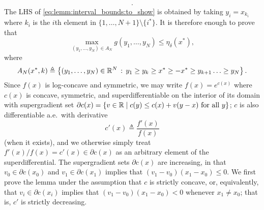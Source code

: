 \begin{proof-of-lemma}[\ref{lem:bound_intervals_delta}]
\begin{align}
{    } \label{eq:g_def}.
  \end{align}
  The LHS of \eqref{eq:lemm:interval_bounds:to_show} is obtained by taking $y_i=x_{k_i}$ where $k_i$ is the $i$th element in $\{1,\ldots,N+1\}\setminus \{i^*\}$. It is therefore enough to prove that 
  \begin{equation*}
    \max_{(y_1,\ldots,y_N) \in A_N} g(y_1,\ldots,y_N) \leq \eta_{\delta}(x^*),
  \end{equation*}
  where 
  \begin{equation*}
    A_N(x^*,k) \triangleq \left\{ (y_1,\ldots,y_N) \in \mathbb{R}^N\, : \, y_1 \ge y_k \ge x^* \ge -x^* \ge y_{k+1} \ldots \ge y_N
    \right\}.
  \end{equation*}
  Since $f(x)$ is log-concave and symmetric, we may write $f(x) = e^{c(x)}$
  where $c(x)$ is concave, symmetric, and superdifferentiable on the interior
  of its domain with
  supergradient set $\partial c(x) = \{v \in \mathbb{R} \mid c(y) \le c(x) + v (y - x) ~
  \mbox{for~all}~ y\}$; $c$ is also
  differentiable a.e.\ with derivative
  \begin{equation*}
    c'(x) \triangleq \frac{f'(x)}{f(x)}
  \end{equation*}
  (when it exists), and we otherwise simply treat $f'(x) / f(x) = c'(x) \in
  \partial c(x)$ as an arbitrary element of the superdifferential.  The
  supergradient sets $\partial c(x)$ are increasing, in that $v_0 \in
  \partial c(x_0)$ and $v_1 \in \partial c(x_1)$ implies that $(v_1 - v_0)
  (x_1 - x_0) \le 0$.  We first prove the lemma under the assumption that
  $c$ is strictly concave, or, equivalently, that $v_i \in \partial c(x_i)$
  implies that $(v_1 - v_0)(x_1 - x_0) < 0$ whenever $x_1 \neq x_0$; that
  is, $c'$ is strictly decreasing.


\end{proof-of-lemma}
